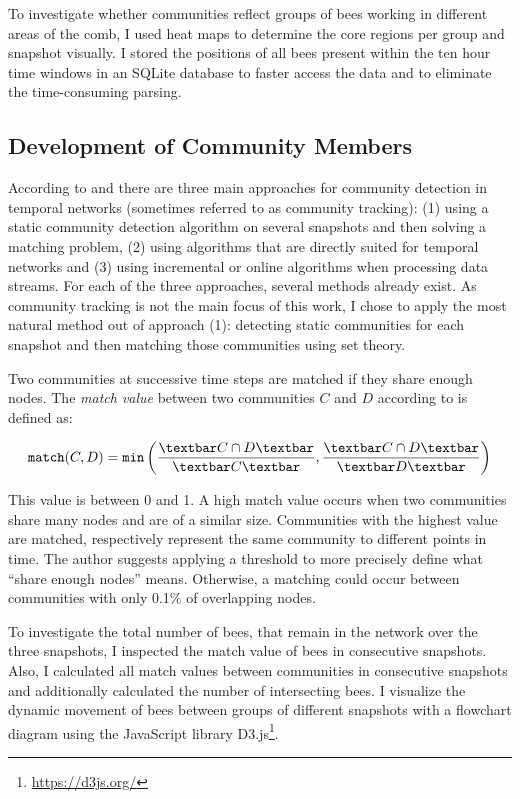 To investigate whether communities reflect groups of bees working in different areas of the comb, I used heat maps to determine the core regions per group and snapshot visually.
I stored the positions of all bees present within the ten hour time windows in an SQLite database to faster access the data and to eliminate the time-consuming parsing.

\subsection{Development of Community Members}
\label{sec:bg:tracking}
According to \textcite{aynaud2013communities} and  \textcite{brodka2014community} there are three main approaches for community detection in temporal networks (sometimes referred to as community tracking): (1) using a static community detection algorithm on several snapshots and then solving a matching problem, (2) using algorithms that are directly suited for temporal networks and (3) using incremental or online algorithms when processing data streams. For each of the three approaches, several methods already exist.
As community tracking is not the main focus of this work, I chose to apply the most natural method out of approach (1): detecting static communities for each snapshot and then matching those communities using set theory.

Two communities at successive time steps are matched if they share enough nodes.
The \emph{match value} between two communities $C$ and $D$ according to \textcite{hopcroft2004tracking} is defined as:

\begin{equation}
\label{eq:match}
\texttt{match}(C,D) = \texttt{min}\left( \frac{\textbar C\cap D \textbar}{\textbar C\textbar }, \frac{\textbar C\cap D \textbar}{\textbar D \textbar }\right)
\end{equation}

This value is between 0 and 1. A high match value occurs when two communities share many nodes and are of a similar size. Communities with the highest value are matched, respectively represent the same community to different points in time. The author suggests applying a threshold to more precisely define what ``share enough nodes'' means. Otherwise, a matching could occur between communities with only 0.1\% of overlapping nodes.

To investigate the total number of bees, that remain in the network over the three snapshots, I inspected the match value of bees in consecutive snapshots. Also, I calculated all match values between communities in consecutive snapshots and additionally calculated the number of intersecting bees. I visualize the dynamic movement
of bees between groups of different snapshots with a flowchart diagram using the JavaScript library D3.js\footnote{\url{https://d3js.org/}}.